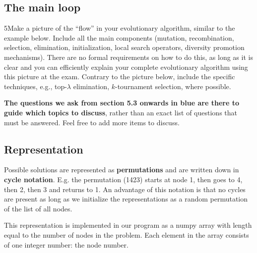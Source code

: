 \documentclass[a4paper,10pt]{article}
\newcommand{\ReplaceMe}[1]{{\color{blue}#1}}
\newcommand{\RemoveMe}[1]{{\color{purple}#1}}
\begin{document}
\subsection{The main loop}

5\ReplaceMe{Make a picture of the ``flow'' in your evolutionary algorithm, similar to the example below. Include all the main components (mutation, recombination, selection, elimination, initialization, local search operators, diversity promotion mechanisms). There are no formal requirements on how to do this, as long as it is clear and you can efficiently explain your complete evolutionary algorithm using this picture at the exam. Contrary to the picture below, include the specific techniques, e.g., top-$\lambda$ elimination, $k$-tournament selection, where possible.}

%

\clearpage
\RemoveMe{\textbf{The questions we ask from section 5.3 onwards in blue are there to guide which topics to discuss}, rather than an exact list of questions that must be answered. Feel free to add more items to discuss.}


\subsection{Representation}
Possible solutions are represented as \textbf{permutations} and are written down in \textbf{cycle notation}. E.g. the permutation (1423) starts at node 1, then goes to 4, then 2, then 3 and returns to 1. An advantage of this notation is that no cycles are present as long as we initialize the representations as a random permutation of the list of all nodes. 

This representation is implemented in our program as a numpy array with length equal to the number of nodes in the problem. Each element in the array consists of one integer number: the node number.
\end{document}
